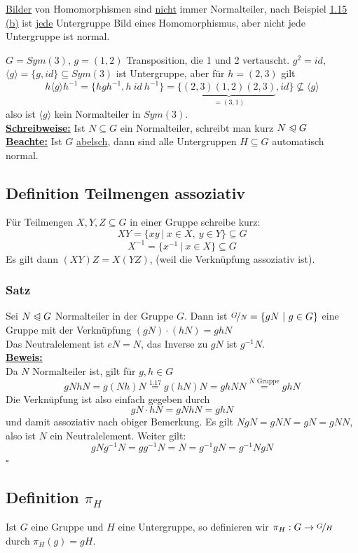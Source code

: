 \documentclass[a4paper, pagesize=pdftex, pdftex, twoside, headsepline, index=totoc,toc=listof, fontsize=10pt, cleardoublepage=empty, headinclude, DIV=13, BCOR=13mm]{scrartcl}
\newcommand{\bet}[1]{\uline{\textbf{#1}}} %
\newcommand{\lh}[1]{\langle #1 \rangle} %
\begin{document}
\uline{Bilder} von Homomorphismen sind \uline{nicht} immer Normalteiler, nach Beispiel \hyperref[sub:homomorphismen]{1.15 (b)} ist \uline{jede} Untergruppe Bild eines Homomorphismus, aber nicht jede Untergruppe ist normal.

$G=Sym(3)$, $g=(1,2)$ Transposition, die 1 und 2 vertauscht. $g^2=id$, $\lh{g}=\{g,id\}\subseteq Sym(3)$ ist Untergruppe, aber für $h=(2,3)$ gilt 
\[
h\lh{g}h^{-1}=\{hgh^{-1}, h~id~h^{-1} \} = \{\underbrace{(2,3)(1,2)(2,3)}_{=(3,1)}, id \} \not\subseteq \lh{g}
\]
also ist $\lh{g}$ kein Normalteiler in $Sym(3)$.\\

\bet{Schreibweise:} Ist $N\subseteq G$ ein Normalteiler, schreibt man kurz $N\trianglelefteqslant G$\\

\bet{Beachte:} Ist $G$ \uline{abelsch}, dann sind alle Untergruppen $H\subseteq G$ automatisch normal.

\subsection{Definition Teilmengen assoziativ}
\label{sub:teilmengen}
Für Teilmengen $X,Y,Z \subseteq G$ in einer Gruppe schreibe kurz:\\
\[XY=\{xy~|~x\in X,~y\in Y\}\subseteq G \]
\[X^{-1}=\{x^{-1}~|~x\in X \}\subseteq G \]
Es gilt dann $(XY)Z=X(YZ)$, (weil die Verknüpfung assoziativ ist).
\subsubsection*{Satz}
Sei $N\trianglelefteqslant G$ Normalteiler in der Gruppe $G$. Dann ist $\nicefrac{G}{N}=\{gN~|~g\in G \}$ eine Gruppe mit der Verknüpfung $(gN)\cdot (hN)=ghN$\\
Das Neutralelement ist $eN=N$, das Inverse zu $gN$ ist $g^{-1}N$.\\
\bet{Beweis:}\\
Da $N$ Normalteiler ist, gilt für $g,h \in G$
\[gNhN=g(Nh)N\stackrel{\hyperref[sub:normalteiler]{1.17}}{=}g(hN)N=ghNN\stackrel{N\text{ Gruppe}}{=}ghN \]
Die Verknüpfung ist also einfach gegeben durch
\[gN\cdot hN=gNhN=ghN \]
und damit assoziativ nach obiger Bemerkung. Es gilt $NgN=gNN=gN=gNN$, also ist $N$ ein Neutralelement. Weiter gilt:
\[gNg^{-1}N=gg^{-1}N=N=g^{-1}gN=g^{-1}NgN \]
\hfill $\square$

\subsection{Definition $\pi_H$}
\label{def_pi_H}
Ist $G$ eine Gruppe und $H$ eine Untergruppe, so definieren wir $\pi_H: G \to \nicefrac{G}{H}$ durch $\pi_H(g)=gH$.
\end{document}
